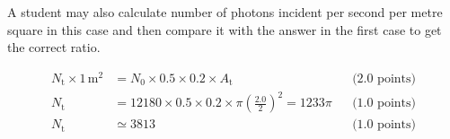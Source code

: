 \begin{description}
A student may also calculate number of photons incident per second per metre
square in this case and then compare it with the answer in the first case to
get the correct ratio.

\item[(T8.3)]
\begin{align*}
N_{\mathrm{t}} \times 1\,\mathrm{m}^2
  &= N_0 \times 0.5 \times 0.2 \times A_{\mathrm{t}}
  && \text{(2.0 points)} \\
N_{\mathrm{t}} &= 12180 \times 0.5 \times 0.2 \times
  \pi\left(\frac{2.0}{2}\right)^2 = 1233\pi
  && \text{(1.0 points)} \\
N_{\mathrm{t}} &\simeq 3813
  && \text{(1.0 points)}
\end{align*}
\end{description}
